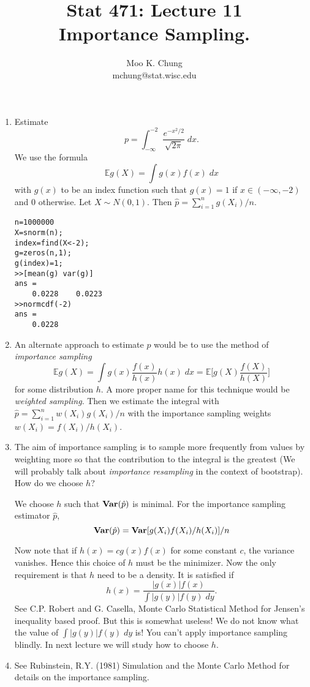 \documentclass[12pt,twocolumn]{article} %
\begin{document}
\title{Stat 471: Lecture 11\\
Importance Sampling.}
\author{Moo K. Chung\\
mchung@stat.wisc.edu}
\maketitle \thispagestyle{empty}

\begin{enumerate}
\item Estimate
$$p=\int_{-\infty}^{-2} \frac{e^{-x^2/2}}{\sqrt{2\pi}} \; dx.$$
We use the formula $$\mathbb{E} g(X) = \int g(x)f(x) \; dx$$ with
$g(x)$ to be an index function such that $g(x)= 1$ if $x \in
(-\infty,-2)$ and 0 otherwise. Let $X \sim N(0,1)$. Then $\hat p =
\sum_{i=1}^ng(X_i)/n$.

\begin{verbatim}
n=1000000
X=snorm(n);
index=find(X<-2);
g=zeros(n,1);
g(index)=1;
>>[mean(g) var(g)]
ans =
    0.0228    0.0223
>>normcdf(-2)
ans =
    0.0228
\end{verbatim}
\item An alternate approach to estimate $p$ would be to use the
method of {\em importance sampling}
$$\mathbb{E} g(X)= \int g(x)\frac{f(x)}{h(x)} h(x)\; dx =
\mathbb{E} \Big[g(X)\frac{f(X)}{h(X)}\Big]$$ for some distribution
$h$. A more proper name for this technique would be {\em weighted
sampling}. Then we estimate the integral with $\hat p=\sum_{i=1}^n
w(X_i)g(X_i)/n$ with the importance sampling weights $w(X_i)
=f(X_i)/h(X_i)$.

\item The aim of importance sampling is to sample more frequently
from values by weighting more so that the contribution to the
integral is the greatest (We will probably talk about {\em
importance resampling} in the context of bootstrap). How do we
choose $h$?

We choose $h$ such that ${\bf Var} (\hat p)$ is minimal. For the
importance sampling estimator $\hat p$,
$${\bf Var}(\hat p) = {\bf Var}[g(X_i)f(X_i)/h(X_i)]/n$$


Now note that if $h(x)=cg(x)f(x)$ for some constant $c$, the
variance vanishes. Hence this choice of $h$ must be the minimizer.
Now the only requirement is that $h$ need to be a density. It is
satisfied if
$$h(x)=\frac{|g(x)|f(x)}{\int |g(y)|f(y) \; dy}.$$
See C.P. Robert and G. Casella, Monte Carlo Statistical Method for
Jensen's inequality based proof. But this is somewhat useless!
We do not know what the value of $\int |g(y)|f(y) \; dy$ is! You
can't apply importance sampling blindly. 
In next lecture we will
study how to choose $h$.

\item See Rubinstein, R.Y. (1981) Simulation and the Monte Carlo
Method for details on the importance sampling.
\end{enumerate}
\end{document}
